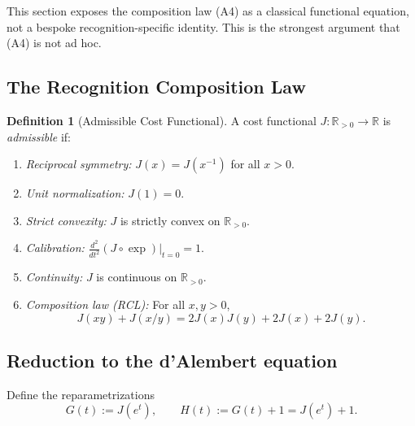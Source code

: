 \documentclass[11pt]{article}
\newcommand{\R}{\mathbb{R}}
\newcommand{\Rp}{\mathbb{R}_{>0}}
\theoremstyle{definition}
\newtheorem{definition}[theorem]{Definition}
\theoremstyle{remark}
\begin{document}
This section exposes the composition law (A4) as a classical
functional equation, not a bespoke recognition-specific identity.
This is the strongest argument that (A4) is not ad hoc.

\subsection{The Recognition Composition Law}

\begin{definition}[Admissible Cost Functional]\label{def:admissible-cost}
A cost functional $J : \Rp \to \R$ is \emph{admissible} if:
\begin{enumerate}
\item \emph{Reciprocal symmetry:}
  $J(x) = J(x^{-1})$ for all $x > 0$.
\item \emph{Unit normalization:} $J(1) = 0$.
\item \emph{Strict convexity:} $J$ is strictly convex on $\Rp$.
\item \emph{Calibration:}
  $\frac{d^2}{dt^2}(J \circ \exp)\big|_{t=0} = 1$.
\item \emph{Continuity:} $J$ is continuous on $\Rp$.
\item \emph{Composition law (RCL):} For all $x, y > 0$,
\begin{equation}\label{eq:rcl}
J(xy) + J(x/y) = 2J(x)J(y) + 2J(x) + 2J(y).
\end{equation}
\end{enumerate}
\end{definition}

\subsection{Reduction to the d'Alembert equation}

Define the reparametrizations
\begin{equation}\label{eq:GH}
G(t) := J(e^t), \qquad H(t) := G(t) + 1 = J(e^t) + 1.
\end{equation}
\end{document}
